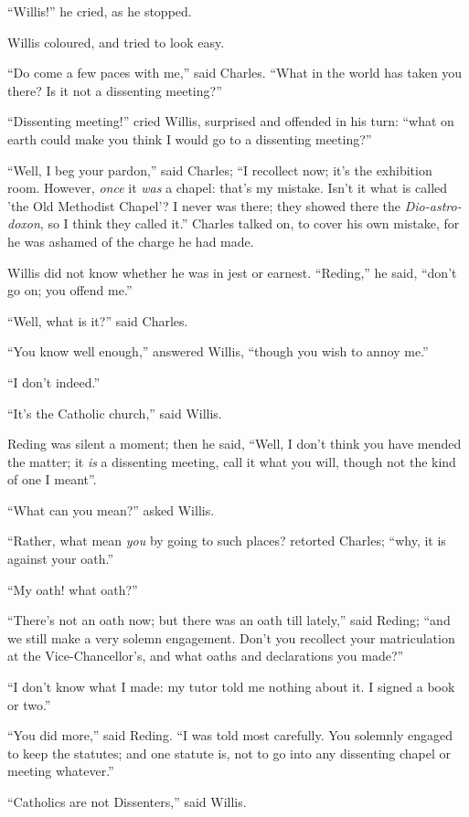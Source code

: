 ``Willis!'' he cried, as he stopped.

Willis coloured, and tried to look easy.

``Do come a few paces with me,'' said Charles. ``What
in the world has taken you there? Is it not a dissenting
meeting?''

``Dissenting meeting!'' cried Willis, surprised and
offended in his turn: ``what on earth could make you think I would
go to a dissenting meeting?''

``Well, I beg your pardon,'' said Charles; ``I
recollect now; it's the exhibition room. However, \emph{once} it \emph{was}
a chapel: that's my mistake. Isn't it what is called 'the Old
Methodist Chapel'? I never was there; they showed there the \emph{Dio-astro-doxon},
so I think they called it.'' Charles talked on, to cover his
own mistake, for he was ashamed of the charge he had made.

Willis did not know whether he was in jest or earnest. ``Reding,''
he said, ``don't go on; you offend me.''

``Well, what is it?'' said Charles.

``You know well enough,'' answered Willis, ``though you
wish to annoy me.''

``I don't indeed.''

``It's the Catholic church,'' said Willis.

Reding was silent a moment; then he said, ``Well, I don't think
you have mended the matter; it \emph{is} a dissenting meeting, call it
what you will, though not the kind of one I meant''.

``What can you mean?'' asked Willis.

``Rather, what mean \emph{you} by going to such places?
retorted Charles; ``why, it is against your oath.''

``My oath! what oath?''

``There's not an oath now; but there was an oath till
lately,'' said Reding; ``and we still make a very solemn
engagement. Don't you recollect your matriculation at the
Vice-Chancellor's, and what oaths and declarations you made?''

``I don't know what I made: my tutor told me nothing about it.
I signed a book or two.''

``You did more,'' said Reding. ``I was told most
carefully. You solemnly engaged to keep the statutes; and one statute
is, not to go into any dissenting chapel or meeting whatever.''

``Catholics are not Dissenters,'' said Willis.

